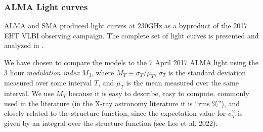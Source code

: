 
\subsubsection{ALMA Light curves}


ALMA and SMA produced \sgra light curves at 230GHz as a byproduct of the 2017 EHT VLBI observing campaign. The complete set of light curves is presented and analyzed in \cite{Wielgus2022}. 

We have chosen to compare the models to the 7 April 2017 ALMA light using the 3 hour {\em modulation index} $M_3$, where $M_T \equiv \sigma_T/\mu_T$, $\sigma_T$ is the standard deviation measured over some interval $T$, and $\mu_T$ is the mean measured over the same interval.  We use $M_T$ because it is easy to describe, easy to compute, commonly used in the literature (in the X-ray astronomy literature it is ``rms \%''), and closely related to the structure function, since the expectation value for $\sigma_T^2$ is given by an integral over the structure function (see Lee et al. 2022).


